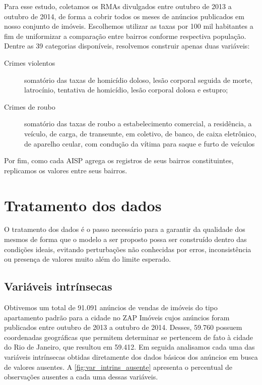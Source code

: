 Para esse estudo, coletamos os RMAs divulgados entre outubro de 2013 a outubro de 2014, de forma a cobrir todos os meses de anúncios publicados em nosso conjunto de imóveis. Escolhemos utilizar as taxas por 100 mil habitantes a fim de uniformizar a comparação entre bairros conforme respectiva população. Dentre as 39 categorias disponíveis, resolvemos construir apenas duas variáveis:

\begin{description}
\item [Crimes violentos] somatório das taxas de homicídio doloso, lesão corporal seguida de morte, latrocínio, tentativa de homicídio, lesão corporal dolosa e estupro;
\item [Crimes de roubo] somatório das taxas de roubo a estabelecimento comercial,  a residência, a veículo, de carga, de transeunte, em coletivo, de banco, de caixa eletrônico, de aparelho ceular, com condução da vítima para saque e furto de veículos
\end{description}

Por fim, como cada AISP agrega os registros de seus bairros constituintes, replicamos os valores entre seus bairros.






\section{Tratamento dos dados}

O tratamento dos dados é o passo necessário para a garantir da qualidade dos mesmos de forma que o modelo a ser proposto possa ser construído dentro das condições ideais, evitando perturbações não conhecidas por erros, inconsistência ou presença de valores muito além do limite esperado.

\subsection{Variáveis intrínsecas}


Obtivemos um total de 91.091 anúncios de vendas de imóveis do tipo apartamento padrão para a cidade no ZAP Imóveis cujos anúncios foram publicados entre outubro de 2013 a outubro de 2014. Desses, 59.760 possuem coordenadas geográficas que permitem determinar se pertencem de fato à cidade do Rio de Janeiro, que resultou em 59.412. Em seguida analisamos cada uma das variáveis intrínsecas obtidas diretamente dos dados básicos dos anúncios em busca de valores ausentes. A \cref{fig:var_intrins_ausente} apresenta o percentual de observações ausentes a cada uma dessas variáveis.



